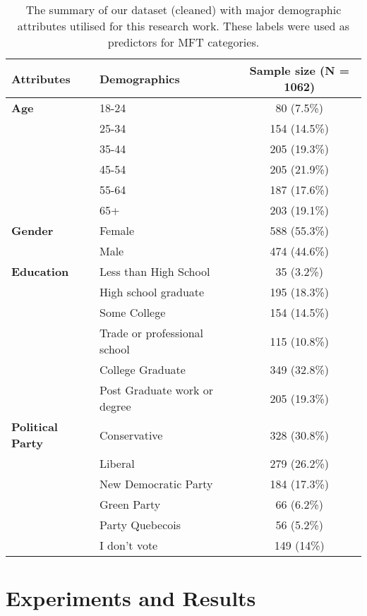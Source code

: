 \documentclass{article}
\begin{document}
\begin{table}[ht]
\centering
\caption{The summary of our dataset (cleaned) with major demographic attributes utilised for this research work. These labels were used as predictors for MFT categories.}
\begin{tabularx}{\textwidth}{ @{}X X C@{} }
\toprule
Attributes & Demographics & Sample size (N = 1062)\\ 
\midrule
\textbf{Age}  &  18-24 & 80 (7.5\%) \\
& 25-34 & 154 (14.5\%) \\
& 35-44 & 205 (19.3\%) \\
& 45-54 & 205 (21.9\%) \\
& 55-64 & 187 (17.6\%) \\
& 65+ & 203 (19.1\%) \\
\midrule
\textbf{Gender} & Female & 588 (55.3\%) \\
& Male & 474 (44.6\%) \\
\midrule
\textbf{Education} & Less than High School & 35 (3.2\%) \\ 
& High school graduate & 195 (18.3\%) \\ 
& Some College  & 154 (14.5\%) \\ 
& Trade or professional school  & 115 (10.8\%) \\ 
& College Graduate  & 349 (32.8\%) \\  
& Post Graduate work or degree  & 205 (19.3\%) \\
\midrule
\textbf{Political Party} &  Conservative &  328 (30.8\%) \\ 
& Liberal &  279 (26.2\%) \\ 
& New Democratic Party &  184 (17.3\%) \\ 
& Green Party &  66 (6.2\%) \\ 
& Party Quebecois &  56 (5.2\%) \\ 
& I don't vote  &  149 (14\%) \\ 
\bottomrule
\end{tabularx}
\label{tab:Canada_ds_demographics}
\end{table}



\section{Experiments and Results}
\end{document}
